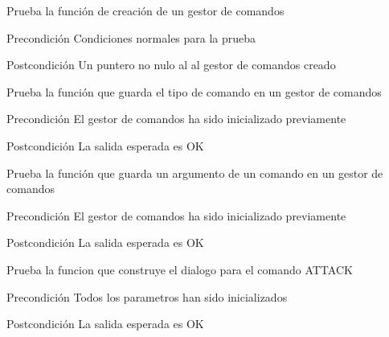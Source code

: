 \begin{DoxyRefList}
\item[\label{test__test000003}%
\hypertarget{test__test000003}{}%
Global \hyperlink{command__test_8c_a9e541c3b6b00a48a58936fba822a8375}{test1\-\_\-command\-\_\-ini} ()]Prueba la función de creación de un gestor de comandos \begin{DoxyPrecond}{Precondición}
Condiciones normales para la prueba 
\end{DoxyPrecond}
\begin{DoxyPostcond}{Postcondición}
Un puntero no nulo al al gestor de comandos creado  
\end{DoxyPostcond}

\item[\label{test__test000006}%
\hypertarget{test__test000006}{}%
Global \hyperlink{command__test_8c_ae6bdd5628a9ce9f8dc59f048a63bc34f}{test1\-\_\-command\-\_\-set\-\_\-cmd} ()]Prueba la función que guarda el tipo de comando en un gestor de comandos \begin{DoxyPrecond}{Precondición}
El gestor de comandos ha sido inicializado previamente 
\end{DoxyPrecond}
\begin{DoxyPostcond}{Postcondición}
La salida esperada es O\-K  
\end{DoxyPostcond}

\item[\label{test__test000009}%
\hypertarget{test__test000009}{}%
Global \hyperlink{command__test_8c_a356e3e961908d1ee87abbcd31bd75094}{test1\-\_\-command\-\_\-set\-\_\-cmd\-\_\-arg} ()]Prueba la función que guarda un argumento de un comando en un gestor de comandos \begin{DoxyPrecond}{Precondición}
El gestor de comandos ha sido inicializado previamente 
\end{DoxyPrecond}
\begin{DoxyPostcond}{Postcondición}
La salida esperada es O\-K  
\end{DoxyPostcond}

\item[\label{test__test000038}%
\hypertarget{test__test000038}{}%
Global \hyperlink{dialogue__test_8c_ac458112e5644ec434eddda004b90db71}{test1\-\_\-dialogue\-\_\-attack} ()]Prueba la funcion que construye el dialogo para el comando A\-T\-T\-A\-C\-K \begin{DoxyPrecond}{Precondición}
Todos los parametros han sido inicializados 
\end{DoxyPrecond}
\begin{DoxyPostcond}{Postcondición}
La salida esperada es O\-K  
\end{DoxyPostcond}


\end{DoxyRefList}
